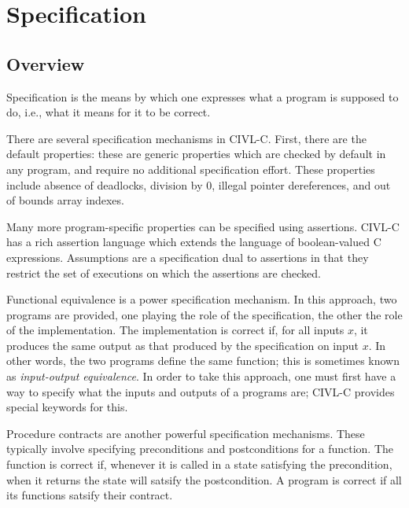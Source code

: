 
\chapter{Specification}

\section{Overview}

Specification is the means by which one expresses what a program is
supposed to do, i.e., what it means for it to be correct.

There are several specification mechanisms in CIVL-C. First, there are
the default properties: these are generic properties which are checked
by default in any program, and require no additional specification
effort. These properties include absence of deadlocks, division by 0,
illegal pointer dereferences, and out of bounds array indexes.

Many more program-specific properties can be specified using
assertions. CIVL-C has a rich assertion language which extends the
language of boolean-valued C expressions. Assumptions are a
specification dual to assertions in that they restrict the set
of executions on which the assertions are checked.

Functional equivalence is a power specification mechanism. In this
approach, two programs are provided, one playing the role of the
specification, the other the role of the implementation. The
implementation is correct if, for all inputs $x$, it produces the same
output as that produced by the specification on input $x$. In other
words, the two programs define the same function; this is sometimes
known as \emph{input-output equivalence}. In order to take this
approach, one must first have a way to specify what the inputs and
outputs of a programs are; CIVL-C provides special keywords for this.

Procedure contracts are another powerful specification mechanisms.
These typically involve specifying preconditions and postconditions
for a function. The function is correct if, whenever it is called in a
state satisfying the precondition, when it returns the state will
satsify the postcondition. A program is correct if all its functions
satsify their contract.

